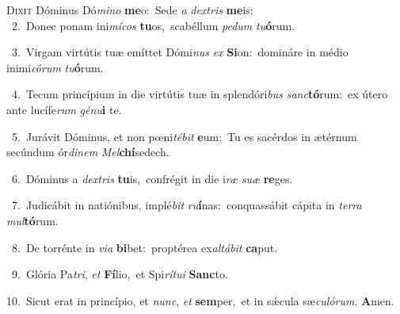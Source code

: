 \lettrine{\initial\textcolor{\initialcolor}{D}}{ixit} Dóminus Dó\-\textit{mi}\-\textit{no} \textbf{me}\-o:~\star Sede \textit{a} \textit{dex}\-\textit{tris} \textbf{me}\-is:\\
{\numbfont\textcolor{\numbcolor}{~2.}}~Donec ponam ini\-\textit{mí}\-\textit{cos} \textbf{tu}\-os,~\star scabéllum \textit{pe}\-\textit{dum} \textit{tu}\-\textbf{ó}rum.\par
{\numbfont\textcolor{\numbcolor}{~3.}}~Virgam virtútis tuæ emíttet Dómi\textit{nus} \textit{ex} \textbf{Si}\-on:~\star domináre in médio inimi\-\textit{có}\-\textit{rum} \textit{tu}\-\textbf{ó}rum.\par
{\numbfont\textcolor{\numbcolor}{~4.}}~Tecum princípium in die virtútis tuæ in splendóri\textit{bus} \textit{sanc}\-\textbf{tó}rum:~\star ex útero ante lucífe\textit{rum} \textit{gé}\-\textit{nu}\textbf{i} te.\par
{\numbfont\textcolor{\numbcolor}{~5.}}~Jurávit Dóminus, et non pœni\-\textit{té}\-\textit{bit} \textbf{e}\-um:~\star Tu es sacérdos in ætérnum secúndum ór\-\textit{di}\-\textit{nem} \textit{Mel}\-\textbf{chí}sedech.\par
{\numbfont\textcolor{\numbcolor}{~6.}}~Dóminus a \textit{dex}\-\textit{tris} \textbf{tu}\-is,~\star confrégit in die i\textit{ræ} \textit{su}\-\textit{æ} \textbf{re}\-ges.\par
{\numbfont\textcolor{\numbcolor}{~7.}}~Judicábit in natiónibus, implé\textit{bit} \textit{ru}\-\textbf{í}nas:~\star conquassábit cápita in \textit{ter}\-\textit{ra} \textit{mul}\-\textbf{tó}rum.\par
{\numbfont\textcolor{\numbcolor}{~8.}}~De torrénte in \textit{vi}\-\textit{a} \textbf{bi}\-bet:~\star proptérea ex\-\textit{al}\-\textit{tá}\textit{bit} \textbf{ca}\-put.\par
{\numbfont\textcolor{\numbcolor}{~9.}}~Glória Pa\-\textit{tri}\-, \textit{et} \textbf{Fí}\-lio,~\star et Spi\-\textit{rí}\-\textit{tu}\textit{i} \textbf{Sanc}\-to.\par
{\numbfont\textcolor{\numbcolor}{10.}}~Sicut erat in princípio, et \textit{nunc}\-, \textit{et} \textbf{sem}\-per,~\star et in sǽcula sæ\-\textit{cu}\-\textit{ló}\textit{rum}. \textbf{A}\-men.\par
